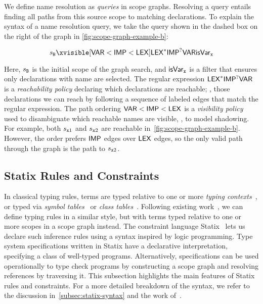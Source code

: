 We define name resolution as \emph{queries} in scope graphs.
Resolving a query entails finding all paths from this source scope to matching declarations.
To explain the syntax of a name resolution query, we take the query shown in the {\color{colorblind-bright-3}dashed box} on the right of the graph in \cref{fig:scope-graph-example-b}:

\begin{equation*}
  \qBase{
    \lblOrdLexVAR
  }{
    s_{\id{B}}
  }{
    \reclos{\lblLEX}\reopt{\lblIMPORT}\lblVAR
  }{
    \hoPred{isVar}{\id{x}}
  }
\end{equation*}

\noindent
Here, $s_{\texttt{B}}$ is the initial scope of the graph search, and $\mathsf{isVar}_{\texttt{x}}$ is a filter that ensures only declarations with name  are selected.
The regular expression $\mathsf{LEX}^\ast\mathsf{IMP}{}^?\mathsf{VAR}$ is a \emph{reachability policy} declaring which declarations are reachable; \ie, those declarations we can reach by following a sequence of labeled edges that match the regular expression.
The path ordering $\mathsf{VAR} < \mathsf{IMP} < \mathsf{LEX}$ is a \emph{visibility policy} used to disambiguate which reachable names are visible, \ie, to model shadowing.
For example, both $s_{\texttt{x}1}$ and $s_{\texttt{x}2}$ are reachable in~\cref{fig:scope-graph-example-b}.
However, the order prefers $\mathsf{IMP}$ edges over $\mathsf{LEX}$ edges, so the only valid path through the graph is the path to $s_{\texttt{x}2}$.


\subsection{Statix Rules and Constraints}%
\label{subsec:statix-rules}
In classical typing rules, terms are typed relative to one or more \emph{typing contexts}~\cite{Pierce2002}, or typed via \emph{symbol tables}~\cite{au72} or \emph{class tables}~\cite{IgarashiPW01}.
Following existing work~\cite{AntwerpenPRV18,PoulsenRTKV18,RouvoetAPKV20}, we can define typing rules in a similar style, but with terms typed relative to one or more scopes in a scope graph instead.
The constraint language Statix~\cite{AntwerpenPRV18,RouvoetAPKV20,AntwerpenV21} lets us declare such inference rules using a syntax inspired by logic programming.
Type system specifications written in Statix have a declarative interpretation, specifying a class of well-typed programs.
Alternatively, specifications can be used operationally to type check programs by constructing a scope graph and resolving references by traversing it.
This subsection highlights the main features of Statix rules and constraints.
For a more detailed breakdown of the syntax, we refer to the discussion in~\cref{subsec:statix-syntax} and the work of~\citet{RouvoetAPKV20}.

